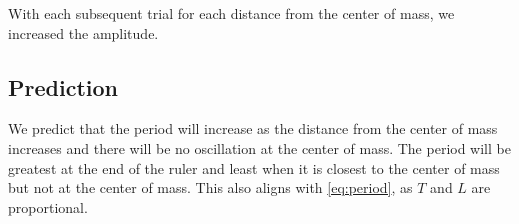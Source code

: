 \documentclass[article, 12pt]{article}
\begin{document}
\begin{table}[H]
    \centering
    \caption{Period and Frequency of Solid Pendulum for Various Points of Rotation}
    \label{tab:solidPendulumData}
\end{table}
With each subsequent trial for each distance from the center of mass, we increased the amplitude. 
\subsection{Prediction} \label{subsec:prediction}
We predict that the period will increase as the distance from the center of mass increases and there will be no oscillation at the center of mass. The period will be greatest at the end of the ruler and least when it is closest to the center of mass but not at the center of mass. This also aligns with \autoref{eq:period}, as $T$ and $L$ are proportional.
\end{document}
